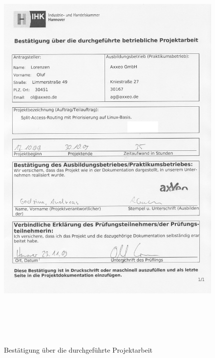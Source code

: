 \documentclass[a4paper,
12pt,
headings=small,
bibliography=totoc,
toc=index,      %
ngerman,
final           %
]{scrreprt}
\begin{document}


%


%


%

%
\begin{figure}[htb]
  \centering
  \includegraphics[height=21cm]{Inhalt/Grafiken/bestaetigung}
  \caption{Bestätigung über die durchgeführte Projektarbeit}
  \label{fig:bestaetigung}
\end{figure}
\end{document}
